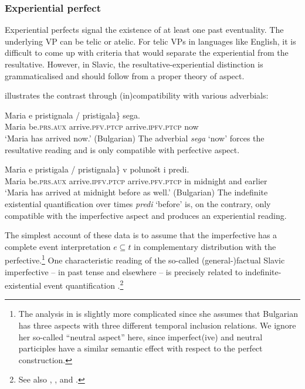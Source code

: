 \documentclass[output=paper,colorlinks,citecolor=brown]{langscibook}
\begin{document}
\subsubsection{Experiential perfect}
Experiential perfects signal the existence of at least one past eventuality. The underlying VP can be  telic or atelic. For telic VPs  in languages like English, it is  difficult to come up with  criteria that would separate the experiential from the resultative. 
However, in Slavic, the resultative-experiential distinction is grammaticalised and should follow from a proper theory of aspect.

\citet[297f.]{pancheva03} illustrates the contrast through (in)compatibility with 
various adverbials:

\ea\gll
Maria e \minsp{\{} pristignala / \minsp{*} pristigala\} sega. \\
Maria be.\textsc{prs}.\textsc{aux} {} arrive.\textsc{pfv}.\textsc{ptcp} {} {} arrive.\textsc{ipfv}.\textsc{ptcp} now \\ \glt
`Maria has arrived now.' \hfill (Bulgarian)
\z
The adverbial {\textit{sega}} `now' forces the resultative reading and is only compatible with perfective aspect.

\ea\gll
Maria e \minsp{\{} pristigala / \minsp{*} pristignala\} v polunošt i predi.\\
Maria be.\textsc{prs}.\textsc{aux} {} arrive.\textsc{ipfv}.\textsc{ptcp} {} {} arrive.\textsc{pfv}.\textsc{ptcp} in midnight and earlier\\
\glt
`Maria has arrived at midnight before as well.' \hfill (Bulgarian)
\z
The indefinite existential quantification over times  {\textit{predi}} `before' is, on the contrary, only compatible with the imperfective aspect and produces an experiential reading. 

The simplest account of these data is to assume that the imperfective has a complete event interpretation $e \subseteq t$ in complementary distribution with the perfective.\footnote{The analysis in \citet{pancheva03} is slightly more complicated since she assumes that Bulgarian has three aspects with three different temporal inclusion relations. We ignore her so-called ``neutral aspect'' here, since imperfect(ive) and neutral participles have a similar semantic effect with respect to the perfect construction.}
One characteristic reading of the so-called (general-)factual Slavic imperfective -- in past tense and elsewhere -- is precisely related to indefinite-existential event quantification \citep{Groenn2015}.\footnote{See also \citet{gronndiss}, , and .}
\end{document}
